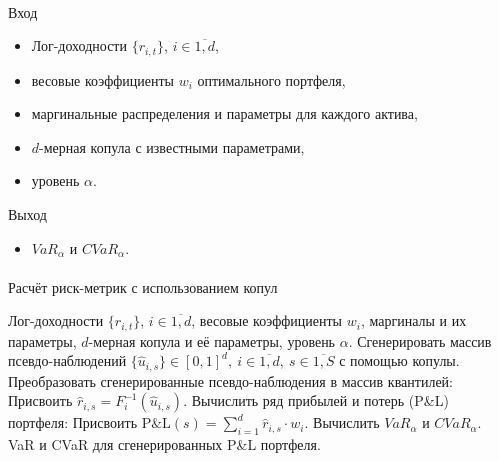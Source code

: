 \documentclass[aspectratio=169]{beamer}
\begin{document}
\begin{frame}{\insertsection}
    \framesubtitle{\insertsubsection}
    \begin{block}{Вход}
        \begin{itemize}
            \item Лог-доходности $\{r_{i,t}\}$, $i \in \overline{1,d}$,
            \item весовые коэффициенты $w_i$ оптимального портфеля, 
            \item маргинальные распределения и параметры для каждого актива, 
            \item $d$-мерная копула с известными параметрами,
            \item уровень $\alpha$.
        \end{itemize}
    \end{block}
    \begin{block}{Выход}
        \begin{itemize}
            \item $\textit{VaR}_\alpha$ и $\textit{CVaR}_\alpha$.
        \end{itemize}
    \end{block}
\end{frame}

\begin{frame}{\insertsection}
    \framesubtitle{\insertsubsection}
    \begin{algorithm}[H]
    \scriptsize
    \caption{Расчёт риск-метрик с использованием копул}
    \label{Alg1}
    \begin{algorithmic}[1]
    	\Require Лог-доходности $\{r_{i,t}\}$, $i \in \overline{1,d}$, весовые коэффициенты $w_i$, маргиналы и их параметры, $d$-мерная копула и её параметры, уровень $\alpha$.
    	\State Сгенерировать массив псевдо-наблюдений 
    	$\{\hat{u}_{i,s}\} \in [0, 1]^d, \ i \in \overline{1,d}, \ s \in \overline{1, S}$ 
    	с помощью копулы.
    	\State Преобразовать сгенерированные псевдо-наблюдения в массив квантилей:
    	        \State Присвоить $\hat{r}_{i,s} = F^{-1}_i (\hat{u}_{i,s})$.
    	    \EndFor
    	\EndFor
    	\State Вычислить ряд прибылей и потерь (P\&L) портфеля:
    	\State Присвоить $\text{P\&L}(s) = \sum_{i=1}^d \hat{r}_{i,s} \cdot w_i$.
    	\EndFor
    	\State Вычислить $\textit{VaR}_\alpha$ и $\textit{CVaR}_\alpha$.
    	\Ensure VaR и CVaR для сгенерированных P\&L портфеля.
    \end{algorithmic}
    \end{algorithm}
\end{frame}
\end{document}
